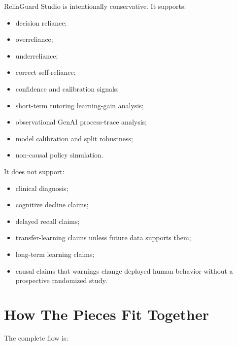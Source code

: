 \documentclass[11pt]{article}
\newcommand{\product}{ReliaGuard Studio}
\begin{document}
\product{} is intentionally conservative. It supports:

\begin{itemize}[leftmargin=*]
  \item decision reliance;
  \item overreliance;
  \item underreliance;
  \item correct self-reliance;
  \item confidence and calibration signals;
  \item short-term tutoring learning-gain analysis;
  \item observational GenAI process-trace analysis;
  \item model calibration and split robustness;
  \item non-causal policy simulation.
\end{itemize}

It does not support:

\begin{itemize}[leftmargin=*]
  \item clinical diagnosis;
  \item cognitive decline claims;
  \item delayed recall claims;
  \item transfer-learning claims unless future data supports them;
  \item long-term learning claims;
  \item causal claims that warnings change deployed human behavior without a prospective randomized study.
\end{itemize}

\section{How The Pieces Fit Together}

The complete flow is:
\end{document}
